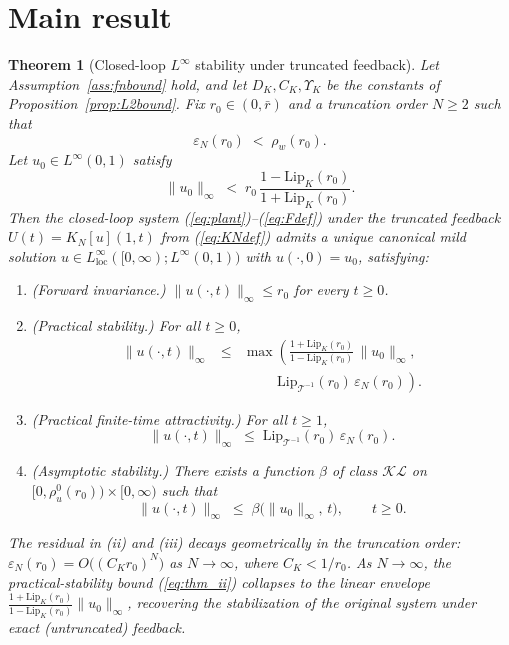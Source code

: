 \documentclass[10pt,a4paper]{amsart}
\newtheorem{theorem}{Theorem}
\newcommand{\Tcal}{\mathcal{T}}
\newcommand{\Linf}{L^\infty}
\newcommand{\Lipk}{\mathrm{Lip}_K}
\newcommand{\LipT}{\mathrm{Lip}_{\Tcal^{-1}}}
\newcommand{\eps}{\varepsilon}
\begin{document}
\section{Main result}\label{sec:mainresult}

\begin{theorem}[Closed-loop $\Linf$ stability under truncated feedback]\label{thm:main}
Let Assumption~\ref{ass:fnbound} hold, and let $D_K, C_K, \Upsilon_K$ be the constants of Proposition~\ref{prop:L2bound}. Fix $r_0 \in (0, \bar r)$ and a truncation order $N \ge 2$ such that
\begin{equation}
\eps_N(r_0) \;<\; \rho_w(r_0).
\label{eq:cond_resid}
\end{equation}
Let $u_0 \in \Linf(0,1)$ satisfy
\begin{equation}
\|u_0\|_\infty \;<\; r_0\,\frac{1 - \Lipk(r_0)}{1 + \Lipk(r_0)}.
\label{eq:cond_init}
\end{equation}
Then the closed-loop system (\ref{eq:plant})--(\ref{eq:Fdef}) under the truncated feedback $U(t) = K_N[u](1,t)$ from (\ref{eq:KNdef}) admits a unique canonical mild solution $u \in \Linf_{\mathrm{loc}}([0,\infty); \Linf(0,1))$ with $u(\cdot, 0) = u_0$, satisfying:
\begin{enumerate}[label=(\roman*)]
\item \emph{(Forward invariance.)} $\|u(\cdot, t)\|_\infty \le r_0$ for every $t \ge 0$.
\item \emph{(Practical stability.)} For all $t \ge 0$,
\begin{eqnarray}
\|u(\cdot,t)\|_\infty &\le& \max\!\left(\frac{1 + \Lipk(r_0)}{1 - \Lipk(r_0)}\,\|u_0\|_\infty,\right. \nonumber \\
&& \quad\quad\;\, \left.\LipT(r_0)\,\eps_N(r_0)\right).
\label{eq:thm_ii}
\end{eqnarray}
\item \emph{(Practical finite-time attractivity.)} For all $t \ge 1$,
\begin{equation}
\|u(\cdot,t)\|_\infty \;\le\; \LipT(r_0)\, \eps_N(r_0).
\label{eq:thm_iii}
\end{equation}
\item \emph{(Asymptotic stability.)} There exists a function $\beta$ of class $\mathcal{KL}$ on $[0, \rho_u^0(r_0)) \times [0, \infty)$ such that
\begin{equation}
\|u(\cdot,t)\|_\infty \;\le\; \beta\bigl(\|u_0\|_\infty,\, t\bigr), \qquad t \ge 0.
\label{eq:thm_iv}
\end{equation}
\end{enumerate}
The residual in (ii) and (iii) decays geometrically in the truncation order: $\eps_N(r_0) = O\bigl((C_K r_0)^N\bigr)$ as $N \to \infty$, where $C_K < 1/r_0$. As $N \to \infty$, the practical-stability bound (\ref{eq:thm_ii}) collapses to the linear envelope $\frac{1+\Lipk(r_0)}{1-\Lipk(r_0)}\|u_0\|_\infty$, recovering the stabilization of the original system under exact (untruncated) feedback.
\end{theorem}
\end{document}
